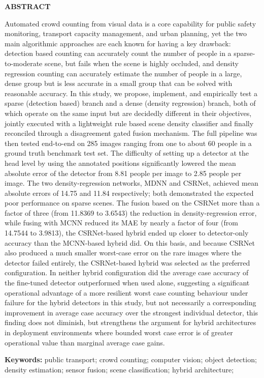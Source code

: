 
\begin{center}
	{\Large\bfseries ABSTRACT}
\end{center}

Automated crowd counting from visual data is a core capability for public safety monitoring, transport capacity management, and urban planning, yet the two main algorithmic approaches are each known for having a key drawback: detection based counting can accurately count the number of people in a sparse-to-moderate scene, but fails when the scene is highly occluded, and density regression counting can accurately estimate the number of people in a large, dense group but is less accurate in a small group that can be solved with reasonable accuracy. In this study, we propose, implement, and empirically test a sparse (detection based) branch and a dense (density regression) branch, both of which operate on the same input but are decidedly different in their objectives, jointly executed with a lightweight rule based scene density classifier and finally reconciled through a disagreement gated fusion mechanism.  The full pipeline was then tested end-to-end on 285 images ranging from one to about 60 people in a ground truth benchmark test set. The difficulty of setting up a detector at the head level by using the annotated positions significantly lowered the mean absolute error of the detector from 8.81 people per image to 2.85 people per image. The two density-regression networks, MDNN and CSRNet, achieved mean absolute errors of 14.75 and 11.84 respectively; both demonstrated the expected poor performance on sparse scenes. The fusion based on the CSRNet more than a factor of three (from 11.8369 to 3.6543) the reduction in density-regression error, while fusing with MCNN reduced its MAE by nearly a factor of four (from 14.7544 to 3.9813), the CSRNet-based hybrid ended up closer to detector-only accuracy than the MCNN-based hybrid did. On this basis, and because CSRNet also produced a much smaller worst-case error on the rare images where the detector failed entirely, the CSRNet-based hybrid was selected as the preferred configuration. In neither hybrid configuration did the average case accuracy of the fine-tuned detector outperformed when used alone, suggesting a significant operational advantage of a more resilient worst case counting behaviour under failure for the hybrid detectors in this study, but not necessarily a corresponding improvement in average case accuracy over the strongest individual detector, this finding does not diminish, but strengthens the argument for hybrid architectures in deployment environments where bounded worst case error is of greater operational value than marginal average case gains.

\noindent\textbf{Keywords:} public transport; crowd counting; computer vision; object detection; density estimation; sensor fusion; scene classification; hybrid architecture;

\clearpage